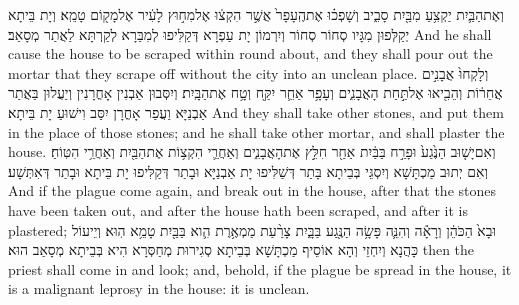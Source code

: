 {וְאֶת\maqqaf הַבַּ֛יִת יַקְצִ֥עַ מִבַּ֖יִת סָבִ֑יב וְשָׁפְכ֗וּ אֶת\maqqaf הֶֽעָפָר֙ אֲשֶׁ֣ר הִקְצ֔וּ אֶל\maqqaf מִח֣וּץ לָעִ֔יר אֶל\maqqaf מָק֖וֹם טָמֵֽא׃}
{וְיָת בֵּיתָא יְקַלְּפוּן מִגָּיו סְחוֹר סְחוֹר וְיִרְמוֹן יָת עַפְרָא דְּקַלִּיפוּ לְמִבַּרָא לְקַרְתָּא לַאֲתַר מְסָאַב׃}
{And he shall cause the house to be scraped within round about, and they shall pour out the mortar that they scrape off without the city into an unclean place.}{}
{וְלָקְחוּ֙ אֲבָנִ֣ים אֲחֵר֔וֹת וְהֵבִ֖יאוּ אֶל\maqqaf תַּ֣חַת הָאֲבָנִ֑ים וְעָפָ֥ר אַחֵ֛ר יִקַּ֖ח וְטָ֥ח אֶת\maqqaf הַבָּֽיִת׃}
{וְיִסְּבוּן אַבְנִין אָחֳרָנִין וְיַעֲלוּן בַּאֲתַר אַבְנַיָּא וַעֲפַר אָחֳרָן יִסַּב וִישׁוּעַ יָת בֵּיתָא׃}
{And they shall take other stones, and put them in the place of those stones; and he shall take other mortar, and shall plaster the house.}{}
{וְאִם\maqqaf יָשׁ֤וּב הַנֶּ֙גַע֙ וּפָרַ֣ח בַּבַּ֔יִת אַחַ֖ר חִלֵּ֣ץ אֶת\maqqaf הָאֲבָנִ֑ים וְאַחֲרֵ֛י הִקְצ֥וֹת אֶת\maqqaf הַבַּ֖יִת וְאַחֲרֵ֥י הִטּֽוֹחַ׃}
{וְאִם יְתוּב מַכְתָּשָׁא וְיִסְגֵּי בְּבֵיתָא בָּתַר דְּשַׁלִּיפוּ יָת אַבְנַיָּא וּבָתַר דְּקַלִּיפוּ יָת בֵּיתָא וּבָתַר דְּאִתְּשָׁע׃}
{And if the plague come again, and break out in the house, after that the stones have been taken out, and after the house hath been scraped, and after it is plastered;}{}
{וּבָא֙ הַכֹּהֵ֔ן וְרָאָ֕ה וְהִנֵּ֛ה פָּשָׂ֥ה הַנֶּ֖גַע בַּבָּ֑יִת צָרַ֨עַת מַמְאֶ֥רֶת הִ֛וא בַּבַּ֖יִת טָמֵ֥א הֽוּא׃}
{וְיֵיעוֹל כָּהֲנָא וְיִחְזֵי וְהָא אוֹסֵיף מַכְתָּשָׁא בְּבֵיתָא סְגִירוּת מְחַסְּרָא הִיא בְּבֵיתָא מְסָאַב הוּא׃}
{then the priest shall come in and look; and, behold, if the plague be spread in the house, it is a malignant leprosy in the house: it is unclean.}{}
